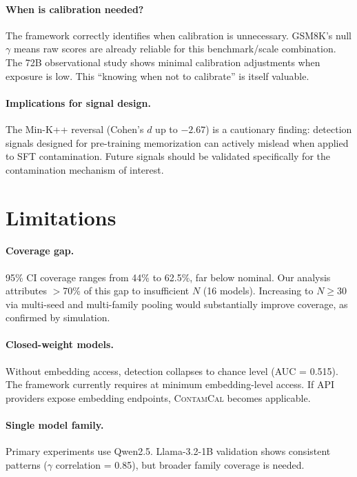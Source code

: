 \documentclass[11pt,a4paper]{article}
\newcommand{\contamcal}{\textsc{ContamCal}}
\begin{document}
\paragraph{When is calibration needed?}
The framework correctly identifies when calibration is unnecessary. GSM8K's null $\gamma$ means raw scores are already reliable for this benchmark/scale combination. The 72B observational study shows minimal calibration adjustments when exposure is low. This ``knowing when not to calibrate'' is itself valuable.

\paragraph{Implications for signal design.}
The Min-K++ reversal (Cohen's $d$ up to $-2.67$) is a cautionary finding: detection signals designed for pre-training memorization can actively mislead when applied to SFT contamination. Future signals should be validated specifically for the contamination mechanism of interest.

\section{Limitations}
\label{sec:limitations}

\paragraph{Coverage gap.} 95\% CI coverage ranges from 44\% to 62.5\%, far below nominal. Our analysis attributes $>$70\% of this gap to insufficient $N$ (16 models). Increasing to $N \geq 30$ via multi-seed and multi-family pooling would substantially improve coverage, as confirmed by simulation.

\paragraph{Closed-weight models.} Without embedding access, detection collapses to chance level (AUC = 0.515). The framework currently requires at minimum embedding-level access. If API providers expose embedding endpoints, \contamcal{} becomes applicable.

\paragraph{Single model family.} Primary experiments use Qwen2.5. Llama-3.2-1B validation shows consistent patterns ($\gamma$ correlation = 0.85), but broader family coverage is needed.
\end{document}
